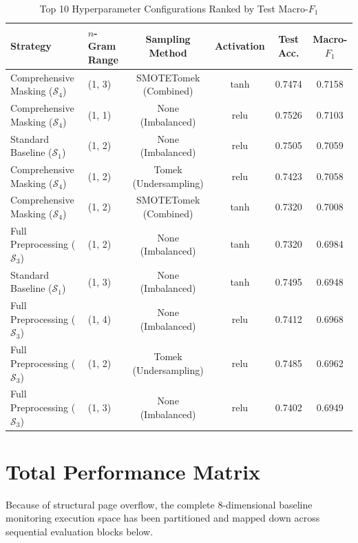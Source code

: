\documentclass[manuscript,screen,review, nonacm]{acmart}
\begin{document}
\begin{table}[H]
\centering
\caption{Top 10 Hyperparameter Configurations Ranked by Test Macro-$F_1$}
\label{tab:top_10_configurations}
\small
\begin{tabular}{llcccc}
\toprule
\textbf{Strategy} & \textbf{$n$-Gram Range} & \textbf{Sampling Method} & \textbf{Activation} & \textbf{Test Acc.} & \textbf{Macro-$F_1$} \\
\midrule
Comprehensive Masking ($\mathcal{S}_4$) & (1, 3) & SMOTETomek (Combined) & tanh & 0.7474 & 0.7158 \\
Comprehensive Masking ($\mathcal{S}_4$) & (1, 1) & None (Imbalanced) & relu & 0.7526 & 0.7103 \\
Standard Baseline ($\mathcal{S}_1$) & (1, 2) & None (Imbalanced) & relu & 0.7505 & 0.7059 \\
Comprehensive Masking ($\mathcal{S}_4$) & (1, 2) & Tomek (Undersampling) & relu & 0.7423 & 0.7058 \\
Comprehensive Masking ($\mathcal{S}_4$) & (1, 2) & SMOTETomek (Combined) & tanh & 0.7320 & 0.7008 \\
Full Preprocessing ($\mathcal{S}_3$) & (1, 2) & None (Imbalanced) & tanh & 0.7320 & 0.6984 \\
Standard Baseline ($\mathcal{S}_1$) & (1, 3) & None (Imbalanced) & tanh & 0.7495 & 0.6948 \\
Full Preprocessing ($\mathcal{S}_3$) & (1, 4) & None (Imbalanced) & relu & 0.7412 & 0.6968 \\
Full Preprocessing ($\mathcal{S}_3$) & (1, 2) & Tomek (Undersampling) & relu & 0.7485 & 0.6962 \\
Full Preprocessing ($\mathcal{S}_3$) & (1, 3) & None (Imbalanced) & relu & 0.7402 & 0.6949 \\
\bottomrule
\end{tabular}
\end{table}

\section{Total Performance Matrix}
\label{app:grand_matrices}

Because of structural page overflow, the complete 8-dimensional baseline monitoring execution space has been partitioned and mapped down across sequential evaluation blocks below.
\end{document}
